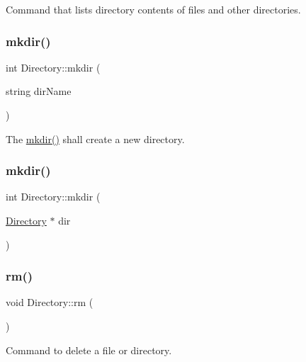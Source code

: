 Command that lists directory contents of files and other directories. 

\mbox{\label{class_directory_adfec0eb4ee88844c1483363b14543e92}} 
\subsubsection{\texorpdfstring{mkdir()}{mkdir()}\hspace{0.1cm}{\footnotesize\ttfamily [1/2]}}
{\footnotesize\ttfamily int Directory\+::mkdir (\begin{DoxyParamCaption}\item[{string}]{dir\+Name }\end{DoxyParamCaption})}



The \hyperlink{class_directory_adfec0eb4ee88844c1483363b14543e92}{mkdir()} shall create a new directory. 

\mbox{\label{class_directory_a02a77fbbfda041d430ec4d6f78ba8618}} 
\subsubsection{\texorpdfstring{mkdir()}{mkdir()}\hspace{0.1cm}{\footnotesize\ttfamily [2/2]}}
{\footnotesize\ttfamily int Directory\+::mkdir (\begin{DoxyParamCaption}\item[{\hyperlink{class_directory}{Directory} $\ast$}]{dir }\end{DoxyParamCaption})}

\mbox{\label{class_directory_ad764e9b4d0568c0acf788a15e0621f1a}} 
\subsubsection{\texorpdfstring{rm()}{rm()}}
{\footnotesize\ttfamily void Directory\+::rm (\begin{DoxyParamCaption}{ }\end{DoxyParamCaption})}



Command to delete a file or directory. 

